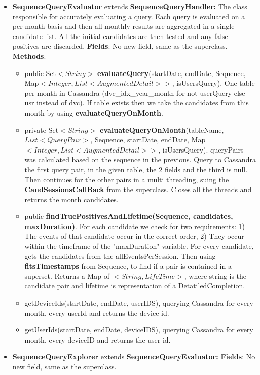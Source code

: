 \documentclass{article}
\begin{document}
\begin{itemize}
	\item \textbf{SequenceQueryEvaluator} extends \textbf{SequenceQueryHandler: }The class responsible for accurately evaluating a query. Each query is evaluated on a per month basis and then all monthly results are
	aggregated in a single candidate list. All the initial candidates are then tested and any false positives are discarded.
	\textbf{Fields}: No new field, same as the superclass.
	\textbf{Methods}:\\
	\begin{itemize}
		\item public Set$<String>$ \textbf{evaluateQuery}(startDate, endDate, Sequence, Map$<Integer, List<AugmentedDetail>>$, isUsersQuery). One table per month in Cassandra (dvc\_idx\_year\_month for not userQuery else usr instead of dvc). If table exists then we take the candidates from this month by using \textbf{evaluateQueryOnMonth}.
		\item private Set$<String>$ \textbf{evaluateQueryOnMonth}(tableName, $List<QueryPair>$, Sequence, startDate, endDate, Map$<Integer, List<AugmentedDetail>>$, isUsersQuery). queryPairs was calculated based on the sequence in the previous. Query to Cassandra the first query pair, in the given table, the 2 fields and the third is null. Then continues for the other pairs in a multi threading, suing the \textbf{CandSessionsCallBack} from the superclass. Closes all the threads and returns the month candidates.
		\item public \textbf{findTruePositivesAndLifetime(Sequence, candidates, maxDuration)}. For each candidate we check for two requirements: 1) The events of that candidate occur in the correct order,
		2) They occur within the timeframe of the "maxDuration" variable. For every candidate, gets the candidates from the allEventsPerSession. Then using \textbf{fitsTimestamps} from Sequence, to find if a pair is contained in a superset. Returns a Map of $<String,LifeTime>$, where string is the candidate pair and lifetime is representation of a DetatiledCompletion.
		\item getDeviceIds(startDate, endDate, userIDS), querying Cassandra for every month, every userId and returns the device id.
		\item getUserIds(startDate, endDate, deviceIDS), querying Cassandra for every month, every deviceID and returns the user id.
	\end{itemize}
	\item \textbf{SequenceQueryExplorer} extends \textbf{SequenceQueryEvaluator:}
	\textbf{Fields}: No new field, same as the superclass.\\

\end{itemize}
\end{document}
